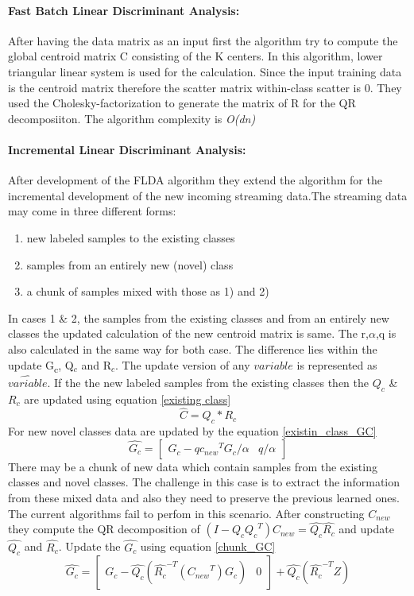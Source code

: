 \paragraph{Fast Batch Linear Discriminant Analysis:}
After having the data matrix as an input first the algorithm try to compute the global centroid matrix C consisting of the K centers. In this algorithm, lower triangular linear system is used for the calculation. Since the input training data is the centroid matrix therefore the scatter matrix within-class scatter is 0. They used the Cholesky-factorization to generate the matrix of R for the QR decomposiiton. The algorithm complexity is \textit{O(dn)}
\paragraph{Incremental Linear Discriminant Analysis:}
After development of the FLDA algorithm they extend the algorithm for the incremental development of the new incoming streaming data.The streaming data may come in three different forms:
\begin{enumerate}
	\item new labeled samples to the existing classes
	\item samples from an entirely new (novel) class
	\item a chunk of samples mixed with those as 1) and 2)
\end{enumerate}
In cases  1 \& 2, the samples from the existing classes and from an entirely new classes the updated calculation of the new centroid matrix is same. The r,$\alpha$,q is also calculated in the same way for both case. The difference lies within the update G\textsubscript{c}, Q$_c$ and R$_c$. The update version of any $variable$ is represented as $\hat{variable}$. If the the new labeled samples from the existing classes then the $Q_c$ \& $R_c$ are updated using equation \ref{existing class}  
\begin{equation} \label{existing class}
\hat{C} = Q_c*R_c
\end{equation}
For new novel classes data are updated by the equation \ref{existin_class_GC}
\begin{equation} \label{existin_class_GC}
\hat{G_c} =\begin{bmatrix}G_c -q{c_{new}}^T G_c/\alpha & q/\alpha\end{bmatrix}
\end{equation}
There may be a chunk of new data which contain samples from the existing classes and novel classes. The challenge in this case is to extract the information from these mixed data and also they need to preserve the previous learned ones. The current algorithms fail to perfom in this scenario. After constructing $C_{new}$ they compute the QR decomposition of $(I-Q_c{Q_c}^T)C_{new} = \hat{Q_c}\hat{R_c}$ and update $\hat{Q_c}$ and $\hat{R_c}$. Update the $\hat{G_c}$ using equation \ref{chunk_GC}
\begin{equation} \label{chunk_GC}
\hat{G_c} = \begin{bmatrix} G_c-\hat{Q_c}(\hat{R_c}^{-T}({C_{new}}^T)G_c) & 0\end{bmatrix} + \hat{Q_c}(\hat{R_c}^{-T}Z)
\end{equation}
